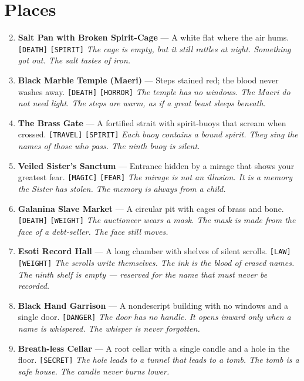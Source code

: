 \section*{ Places}
\label{sec:ashaan-places}
\begin{enumerate}
\setcounter{enumi}{1}
\item \textbf{Salt Pan with Broken Spirit-Cage} --- A white flat where the air hums. \texttt{[DEATH]} \texttt{[SPIRIT]}
  \hfill \textit{The cage is empty, but it still rattles at night. Something got out. The salt tastes of iron.}
\item \textbf{Black Marble Temple (Maeri)} --- Steps stained red; the blood never washes away. \texttt{[DEATH]} \texttt{[HORROR]}
  \hfill \textit{The temple has no windows. The Maeri do not need light. The steps are warm, as if a great beast sleeps beneath.}
\item \textbf{The Brass Gate} --- A fortified strait with spirit-buoys that scream when crossed. \texttt{[TRAVEL]} \texttt{[SPIRIT]}
  \hfill \textit{Each buoy contains a bound spirit. They sing the names of those who pass. The ninth buoy is silent.}
\item \textbf{Veiled Sister's Sanctum} --- Entrance hidden by a mirage that shows your greatest fear. \texttt{[MAGIC]} \texttt{[FEAR]}
  \hfill \textit{The mirage is not an illusion. It is a memory the Sister has stolen. The memory is always from a child.}
\item \textbf{Galanina Slave Market} --- A circular pit with cages of brass and bone. \texttt{[DEATH]} \texttt{[WEIGHT]}
  \hfill \textit{The auctioneer wears a mask. The mask is made from the face of a debt-seller. The face still moves.}
\item \textbf{Esoti Record Hall} --- A long chamber with shelves of silent scrolls. \texttt{[LAW]} \texttt{[WEIGHT]}
  \hfill \textit{The scrolls write themselves. The ink is the blood of erased names. The ninth shelf is empty --- reserved for the name that must never be recorded.}
\item \textbf{Black Hand Garrison} --- A nondescript building with no windows and a single door. \texttt{[DANGER]}
  \hfill \textit{The door has no handle. It opens inward only when a name is whispered. The whisper is never forgotten.}
\item \textbf{Breath-less Cellar} --- A root cellar with a single candle and a hole in the floor. \texttt{[SECRET]}
  \hfill \textit{The hole leads to a tunnel that leads to a tomb. The tomb is a safe house. The candle never burns lower.}

\end{enumerate}
